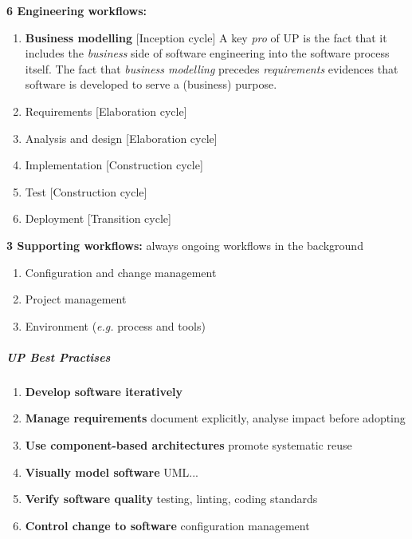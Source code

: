 \documentclass[a4paper]{article}
\providecommand{\tightlist}{%
  \setlength{\itemsep}{0pt}\setlength{\parskip}{0pt}}
\let\oldsubparagraph\subparagraph
\renewcommand{\subparagraph}[1]{\oldsubparagraph{#1}\mbox{}}
\begin{document}
\textbf{6 Engineering workflows:}

\begin{enumerate}
\def\labelenumi{\arabic{enumi}.}
\tightlist
\item
  \textbf{Business modelling} {[}Inception cycle{]} A key \emph{pro} of
  UP is the fact that it includes the \emph{business} side of software
  engineering into the software process itself. The fact that
  \emph{business modelling} precedes \emph{requirements} evidences that
  software is developed to serve a (business) purpose.
\item
  Requirements {[}Elaboration cycle{]}
\item
  Analysis and design {[}Elaboration cycle{]}
\item
  Implementation {[}Construction cycle{]}
\item
  Test {[}Construction cycle{]}
\item
  Deployment {[}Transition cycle{]}
\end{enumerate}

\textbf{3 Supporting workflows:} always ongoing workflows in the
background

\begin{enumerate}
\def\labelenumi{\arabic{enumi}.}
\tightlist
\item
  Configuration and change management
\item
  Project management
\item
  Environment (\emph{e.g.} process and tools)
\end{enumerate}

\hypertarget{up-best-practises}{%
\subparagraph{UP Best Practises}\label{up-best-practises}}

\begin{enumerate}
\def\labelenumi{\arabic{enumi}.}
\tightlist
\item
  \textbf{Develop software iteratively}
\item
  \textbf{Manage requirements} document explicitly, analyse impact
  before adopting
\item
  \textbf{Use component-based architectures} promote systematic reuse
\item
  \textbf{Visually model software} UML...
\item
  \textbf{Verify software quality} testing, linting, coding standards
\item
  \textbf{Control change to software} configuration management
\end{enumerate}
\end{document}

